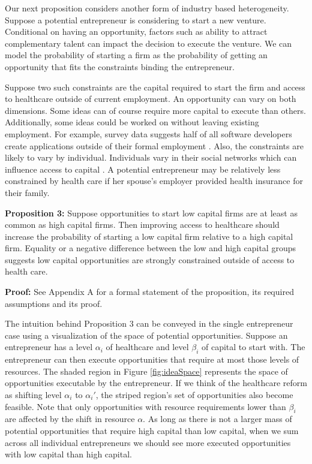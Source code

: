\documentclass[12pt]{article}
\begin{document}
Our next proposition considers another form of industry based heterogeneity. Suppose a potential entrepreneur is considering to start a new venture. Conditional on having an opportunity, factors such as ability to attract complementary talent \citep{stuart2005social} can impact the decision to execute the venture. We can model the probability of starting a firm as the probability of getting an opportunity that fits the constraints binding the entrepreneur. 

Suppose two such constraints are the capital required to start the firm and access to healthcare  outside of current employment. An opportunity can vary on both dimensions. Some ideas can of course require more capital to execute than others. Additionally, some ideas could be worked on without leaving existing employment. For example, survey data suggests half of all software developers create applications outside of their formal employment \citep{evans1989estimated}. Also, the constraints are likely to vary by individual. Individuals vary in their social networks which can influence access to capital \citep{uzzi1999embeddedness}. A potential entrepreneur may be relatively less constrained by health care if her spouse's employer provided health insurance for their family. 

\textbf{Proposition 3:} 
Suppose opportunities to start low capital firms are at least as common as high capital firms. Then improving access to healthcare should increase the probability of starting a low capital firm relative to a high capital firm. Equality or a negative difference between the low and high capital groups suggests low capital opportunities are strongly constrained outside of access to health care. 

\textbf{Proof:}
See Appendix A for a formal statement of the proposition, its required assumptions and its proof. 

The intuition behind Proposition 3 can be conveyed in the single entrepreneur case using a visualization of the space of potential opportunities. Suppose an entrepreneur has a level $\alpha_i$ of healthcare and level $\beta_i$ of capital to start with. The entrepreneur can then execute opportunities that require at most those levels of resources. The shaded region in Figure \ref{fig:ideaSpace} represents the space of opportunities executable by the entrepreneur. If we think of the healthcare reform as shifting level $\alpha_i$ to $\alpha_i'$, the striped region's set of opportunities also become feasible. Note that only opportunities with resource requirements lower than $\beta_i$ are affected by the shift in resource $\alpha$. As long as there is not a larger mass of potential opportunities that require high capital than low capital, when we sum across all individual entrepreneurs we should see more executed opportunities with low capital than high capital. 
\end{document}

